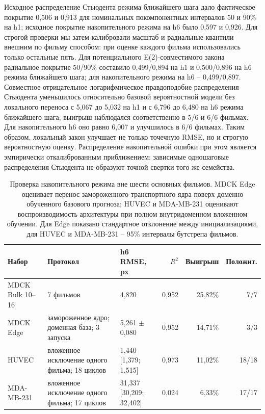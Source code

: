 \documentclass[11pt,a4paper]{article}
\begin{document}
Исходное распределение Стьюдента режима ближайшего шага дало фактическое покрытие 0,506 и 0,913 для номинальных покомпонентных интервалов 50 и 90\% на h1; исходное покрытие накопительного режима на h6 было 0,597 и 0,926. Для строгой проверки мы затем калибровали масштаб и радиальные квантили внешним по фильму способом: при оценке каждого фильма использовались только остальные пять. Для потенциального E(2)-совместимого закона радиальное покрытие 50/90\% составило 0,499/0,894 на h1 и 0,500/0,896 на h6 режима ближайшего шага; для накопительного режима на h6 -- 0,499/0,897. Совместное отрицательное логарифмическое правдоподобие распределения Стьюдента уменьшилось относительно базовой вероятностной модели без локального переноса с 5,067 до 5,032 на h1 и с 6,796 до 6,480 на h6 режима ближайшего шага; выигрыш наблюдался соответственно в 5/6 и 6/6 фильмах. Для накопительного h6 оно равно 6,007 и улучшилось в 6/6 фильмах. Таким образом, локальный закон улучшает не только точечную RMSE, но и строгую вероятностную оценку. Распределение накопительной ошибки при этом является эмпирически откалиброванным приближением: зависимые одношаговые распределения Стьюдента не образуют точной свертки того же семейства.


\begin{table}[H]
\centering
\caption{Проверка накопительного режима вне шести основных фильмов. MDCK Edge оценивает перенос замороженного транспортного ядра поверх доменно обученного базового прогноза; HUVEC и MDA-MB-231 оценивают воспроизводимость архитектуры при полном внутридоменном вложенном обучении. Для Edge показано стандартное отклонение между инициализациями, для HUVEC и MDA-MB-231 -- 95\% интервалы бутстрепа фильмов.}
\label{tab:transfer}
\small
\setlength{\tabcolsep}{4pt}
\begin{tabularx}{\textwidth}{@{}L{0.22\textwidth} Y L{0.21\textwidth} r r r@{}}
\toprule
Набор & Протокол & h6 RMSE, px & $R^2$ & Выигрыш & Положит. \\
\midrule
MDCK Bulk 10--16 & 7 фильмов & 4{,}820 & 0{,}952 & 25{,}82\% & 7/7 \\
MDCK Edge & замороженное ядро; доменная база; 3 запуска & 5{,}261 $\pm$ 0{,}080 & 0{,}952 & 14{,}71\% & 3/3 \\
HUVEC & вложенное исключение одного фильма; 18 циклов & 1{,}440 [1{,}379; 1{,}515] & 0{,}973 & 11{,}02\% & 18/18 \\
MDA-MB-231 & вложенное исключение одного фильма; 17 циклов & 31{,}337 [30{,}209; 32{,}402] & 0{,}024 & 6{,}33\% & 17/17 \\
\bottomrule
\end{tabularx}
\end{table}
\end{document}
